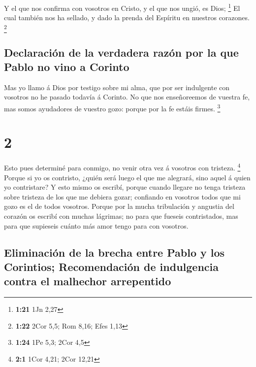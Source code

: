  Y el que nos confirma con vosotros en Cristo, y el que
nos ungió, es Dios; \footnote{\textbf{1:21} 1Jn 2,27}  El
cual también nos ha sellado, y dado la prenda del Espíritu en nuestros
corazones. \footnote{\textbf{1:22} 2Cor 5,5; Rom 8,16; Efes 1,13}

\hypertarget{declaraciuxf3n-de-la-verdadera-razuxf3n-por-la-que-pablo-no-vino-a-corinto}{%
\subsection{Declaración de la verdadera razón por la que Pablo no vino a
Corinto}\label{declaraciuxf3n-de-la-verdadera-razuxf3n-por-la-que-pablo-no-vino-a-corinto}}

 Mas yo llamo á Dios por testigo sobre mi alma, que por
ser indulgente con vosotros no he pasado todavía á Corinto.
 No que nos enseñoreemos de vuestra fe, mas somos
ayudadores de vuestro gozo: porque por la fe estáis firmes. \footnote{\textbf{1:24}
  1Pe 5,3; 2Cor 4,5}

\hypertarget{section-1}{%
\section{2}\label{section-1}}

 Esto pues determiné para conmigo, no venir otra vez á
vosotros con tristeza. \footnote{\textbf{2:1} 1Cor 4,21; 2Cor 12,21}
 Porque si yo os contristo, ¿quién será luego el que me
alegrará, sino aquel á quien yo contristare?  Y esto mismo
os escribí, porque cuando llegare no tenga tristeza sobre tristeza de
los que me debiera gozar; confiando en vosotros todos que mi gozo es el
de todos vosotros.  Porque por la mucha tribulación y
angustia del corazón os escribí con muchas lágrimas; no para que fueseis
contristados, mas para que supieseis cuánto más amor tengo para con
vosotros.

\hypertarget{eliminaciuxf3n-de-la-brecha-entre-pablo-y-los-corintios-recomendaciuxf3n-de-indulgencia-contra-el-malhechor-arrepentido}{%
\subsection{Eliminación de la brecha entre Pablo y los Corintios;
Recomendación de indulgencia contra el malhechor
arrepentido}\label{eliminaciuxf3n-de-la-brecha-entre-pablo-y-los-corintios-recomendaciuxf3n-de-indulgencia-contra-el-malhechor-arrepentido}}

